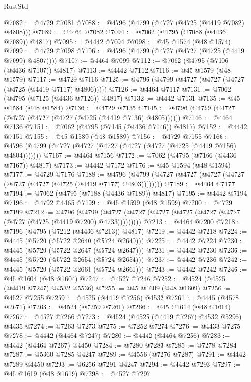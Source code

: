 \begin{lexlean}{RustStd}
\begin{coremodule}
@7082 := @4729 @7081
@7088 := @4796 (@4799 (@4727 (@4725 (@4419 @7082) @4808)))
@7089 := @4464 @7082
@7094 := @7062 (@4795 (@7088 (@4436 @7089)) @4817)
@7095 := @4442 @7094
@7098 := @45 @1574 (@48 @1574)
@7099 := @4729 @7098
@7106 := @4796 (@4799 (@4727 (@4727 (@4725 (@4419 @7099) @4807))))
@7107 := @4464 @7099
@7112 := @7062 (@4795 (@7106 (@4436 @7107)) @4817)
@7113 := @4442 @7112
@7116 := @45 @1579 (@48 @1579)
@7117 := @4729 @7116
@7125 := @4796 (@4799 (@4727 (@4727 (@4727 (@4725 (@4419 @7117) @4806)))))
@7126 := @4464 @7117
@7131 := @7062 (@4795 (@7125 (@4436 @7126)) @4817)
@7132 := @4442 @7131
@7135 := @45 @1584 (@48 @1584)
@7136 := @4729 @7135
@7145 := @4796 (@4799 (@4727 (@4727 (@4727 (@4727 (@4725 (@4419 @7136) @4805))))))
@7146 := @4464 @7136
@7151 := @7062 (@4795 (@7145 (@4436 @7146)) @4817)
@7152 := @4442 @7151
@7155 := @45 @1589 (@48 @1589)
@7156 := @4729 @7155
@7166 := @4796 (@4799 (@4727 (@4727 (@4727 (@4727 (@4727 (@4725 (@4419 @7156) @4804)))))))
@7167 := @4464 @7156
@7172 := @7062 (@4795 (@7166 (@4436 @7167)) @4817)
@7173 := @4442 @7172
@7176 := @45 @1594 (@48 @1594)
@7177 := @4729 @7176
@7188 := @4796 (@4799 (@4727 (@4727 (@4727 (@4727 (@4727 (@4727 (@4725 (@4419 @7177) @4803))))))))
@7189 := @4464 @7177
@7194 := @7062 (@4795 (@7188 (@4436 @7189)) @4817)
@7195 := @4442 @7194
@7196 := @4792 @4465
@7199 := @45 @1599 (@48 @1599)
@7200 := @4729 @7199
@7212 := @4796
    (@4799 (@4727 (@4727 (@4727 (@4727 (@4727 (@4727 (@4727 (@4725 (@4419 @7200) @4733)))))))))
@7213 := @4464 @7200
@7218 := @7196 (@4795 (@7212 (@4436 @7213)) @4817)
@7219 := @4442 @7218
@7224 := @4445 (@5720 (@5722 @2640 (@5724 @2640)))
@7225 := @4442 @7224
@7230 := @4445 (@5720 (@5722 @2647 (@5724 @2647)))
@7231 := @4442 @7230
@7236 := @4445 (@5720 (@5722 @2654 (@5724 @2654)))
@7237 := @4442 @7236
@7242 := @4445 (@5720 (@5722 @2661 (@5724 @2661)))
@7243 := @4442 @7242
@7246 := @45 @1604 (@48 @1604)
@7247 := @4527 @7246
@7252 := @4524 (@4525 (@4419 @7247) @4532 @5536)
@7255 := @45 @1609 (@48 @1609)
@7256 := @4527 @7255
@7259 := @4525 (@4419 @7256) @4532
@7261 := @4445 (@4578 @2671)
@7263 := @4524 (@7259 @7261)
@7266 := @45 @1614 (@48 @1614)
@7267 := @4527 @7266
@7273 := @4524 (@4525 (@4419 @7267) @4532 @5296) @4435
@7274 := @7263 @7273
@7275 := @7252 @7274
@7276 := @4433 @7275
@7278 := @4442 (@4464 @7247)
@7280 := @4442 (@4464 @7256)
@7283 := @4442 (@4464 @7267) @4450
@7284 := @7280 @7283
@7285 := @7278 @7284
@7287 := @5360 @7285 @4247
@7289 := @4556 (@7276 @7287)
@7291 := @4442 @7289 @4450
@7293 := @6256 @7291 @4247
@7294 := @4442 @7293
@7297 := @45 @1619 (@48 @1619)
@7298 := @4527 @7297

\end{coremodule}
\end{lexlean}

